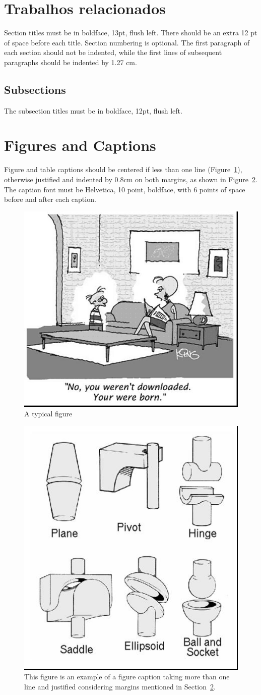 \documentclass[12pt]{article}
\theoremstyle{plain}
\begin{document}
\section{Trabalhos relacionados}

Section titles must be in boldface, 13pt, flush left. There should be an extra
12 pt of space before each title. Section numbering is optional. The first
paragraph of each section should not be indented, while the first lines of
subsequent paragraphs should be indented by 1.27 cm.

\subsection{Subsections}

The subsection titles must be in boldface, 12pt, flush left.

\section{Figures and Captions}\label{sec:figs}


Figure and table captions should be centered if less than one line
(Figure~\ref{fig:exampleFig1}), otherwise justified and indented by 0.8cm on
both margins, as shown in Figure~\ref{fig:exampleFig2}. The caption font must
be Helvetica, 10 point, boldface, with 6 points of space before and after each
caption.

\begin{figure}[ht]
\centering
\includegraphics[width=.5\textwidth]{fig1.jpg}
\caption{A typical figure}
\label{fig:exampleFig1}
\end{figure}

\begin{figure}[ht]
\centering
\includegraphics[width=.3\textwidth]{fig2.jpg}
\caption{This figure is an example of a figure caption taking more than one
  line and justified considering margins mentioned in Section~\ref{sec:figs}.}
\label{fig:exampleFig2}
\end{figure}
\end{document}
